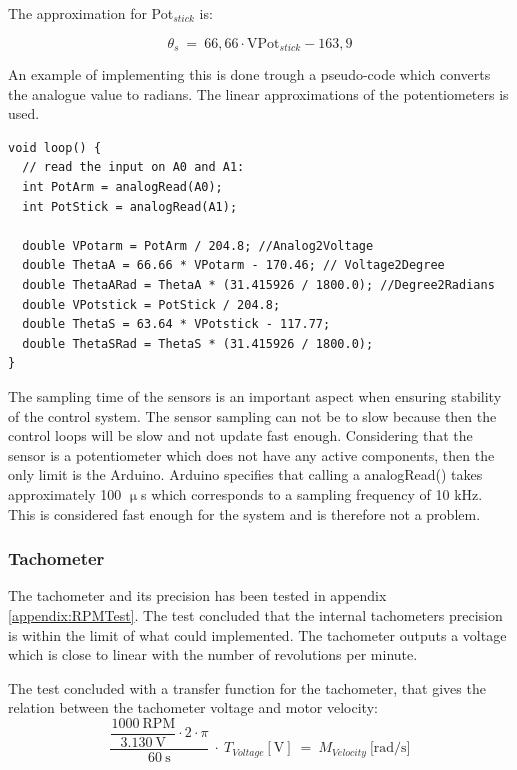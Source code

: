 The approximation for Pot$_{stick}$ is:

\begin{equation}
\theta_s\ =\ 66,66 \cdot \text{VPot}_{stick} - 163,9
\end{equation}

\startexplain
\stopexplain

An example of implementing this is done trough a pseudo-code which converts the analogue value to radians. The linear approximations of the potentiometers is used.
\begin{lstlisting}
void loop() {
  // read the input on A0 and A1:
  int PotArm = analogRead(A0);
  int PotStick = analogRead(A1);

  double VPotarm = PotArm / 204.8; //Analog2Voltage
  double ThetaA = 66.66 * VPotarm - 170.46; // Voltage2Degree
  double ThetaARad = ThetaA * (31.415926 / 1800.0); //Degree2Radians
  double VPotstick = PotStick / 204.8;
  double ThetaS = 63.64 * VPotstick - 117.77;
  double ThetaSRad = ThetaS * (31.415926 / 1800.0);
}
\end{lstlisting}    

The sampling time of the sensors is an important aspect when ensuring stability of the control system. The sensor sampling can not be to slow because then the control loops will be slow and not update fast enough. Considering that the sensor is a potentiometer which does not have any active components, then the only limit is the Arduino. Arduino specifies that calling a analogRead() takes approximately 100 $\upmu$s which corresponds to a sampling frequency of 10 kHz. This is considered fast enough for the system and is therefore not a problem. 

\subsubsection*{Tachometer}
The tachometer and its precision has been tested in appendix \ref{appendix:RPMTest}. The test concluded that the internal tachometers precision is within the limit of what could implemented. The tachometer outputs a voltage which is close to linear with the number of revolutions per minute.

The test concluded with a transfer function for the tachometer, that gives the relation between the tachometer voltage and motor velocity:
\begin{equation}
\dfrac{\dfrac{1000\ \text{RPM}}{3.130\ \text{V}} \cdot 2 \cdot \pi}{60\ \text{s}}\ \cdot\ T_{Voltage}[\text{V}]\ =\ M_{Velocity}\ \text{[rad/s]}
\end{equation}


